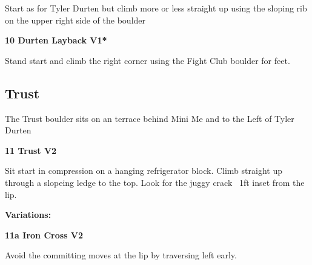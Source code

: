 \begin{multicols}{2}
\begin{minipage}{\linewidth}
					\begin{adjustwidth}{0.5cm}{}				
					Start as for Tyler Durten but climb more or less straight up using the sloping rib on the upper right side of the boulder
					\end{adjustwidth}
					\end{minipage}
					\begin{minipage}{\linewidth}	
					\label{rt:Durten Layback}
\colorbox{green!20}{
\parbox{0.95\textwidth}{
\textbf{
10 Durten Layback V1*  
}
}
}

					\begin{adjustwidth}{0.5cm}{}				
					Stand start and climb the right corner using the Fight Club boulder for feet.
					\end{adjustwidth}
					\end{minipage}
			\begin{minipage}{\columnwidth}
			\subsection*{Trust}\label{bf:Trust}
			The Trust boulder sits on an terrace behind Mini Me and to the Left of Tyler Durten
			
			\end{minipage}
			

					\begin{minipage}{\linewidth}	
					\label{rt:Trust}
\colorbox{green!20}{
\parbox{0.95\textwidth}{
\textbf{
11 Trust V2     
}
}
}

					\begin{adjustwidth}{0.5cm}{}				
					Sit start in compression on a hanging refrigerator block. Climb straight up through a slopeing ledge to the top. Look for the juggy crack ~1ft inset from the lip.
					\end{adjustwidth}
					\end{minipage}
						\begin{adjustwidth}{0.5cm}{}				
						\textbf{Variations:} \newline
							\begin{minipage}{\linewidth}	
							\label{vr:Iron Cross}
\colorbox{green!20}{
\parbox{0.95\textwidth}{
\textbf{
11a Iron Cross V2   
}
}
}

							\begin{adjustwidth}{0.5cm}{}				
							Avoid the committing moves at the lip by traversing left early.
							\end{adjustwidth}
							\end{minipage}
						\end{adjustwidth}
			\begin{minipage}{\columnwidth}

\end{minipage}
\end{multicols}
